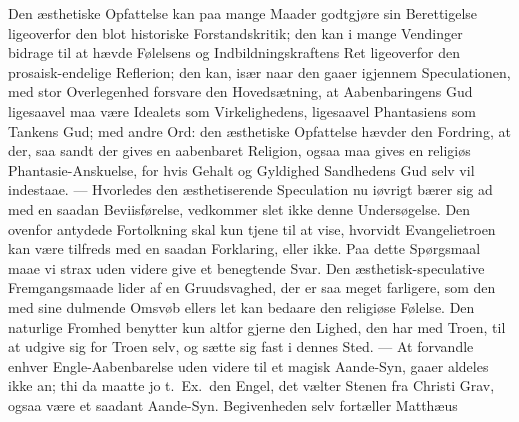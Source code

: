 \documentclass[12pt,a4paper]{book}
\begin{document}
Den æsthetiske Opfattelse kan paa mange Maader godtgjøre sin Berettigelse ligeoverfor
den blot historiske Forstandskritik; den kan i mange Vendinger bidrage til at hævde
Følelsens og Indbildningskraftens Ret ligeoverfor den prosaisk-endelige Reflerion; den
kan, især naar den gaaer igjennem Speculationen, med stor Overlegenhed forsvare den
Hovedsætning, at Aabenbaringens Gud ligesaavel maa være Idealets som Virkelighedens,
ligesaavel Phantasiens som Tankens Gud; med andre Ord: den æsthetiske
Opfattelse hævder den Fordring, at der, saa sandt der gives en aabenbaret Religion,
ogsaa maa gives en religiøs Phantasie-Anskuelse, for hvis Gehalt og Gyldighed
Sandhedens Gud selv vil indestaae. --- Hvorledes den æsthetiserende Speculation nu
iøvrigt bærer sig ad med en saadan Beviisførelse, vedkommer slet ikke denne Undersøgelse.
Den ovenfor antydede Fortolkning skal kun tjene til at vise, hvorvidt Evangelietroen kan
være tilfreds med en saadan Forklaring, eller ikke. Paa dette Spørgsmaal maae vi strax
uden videre give et benegtende Svar. Den æsthetisk-speculative Fremgangsmaade lider af
en Gruudsvaghed, der er saa meget farligere, som den med sine dulmende Omsvøb ellers let
kan bedaare den religiøse Følelse. Den naturlige Fromhed benytter kun altfor gjerne den
Lighed, den har med Troen, til at udgive sig for Troen selv, og sætte sig fast i dennes
Sted. --- At forvandle enhver Engle-Aabenbarelse uden videre til et magisk Aande-Syn,
gaaer aldeles ikke an; thi da maatte jo t.\ Ex.\ den Engel, det vælter Stenen fra
Christi Grav, ogsaa være et saadant Aande-Syn. Begivenheden selv fortæller Matthæus
\end{document}
